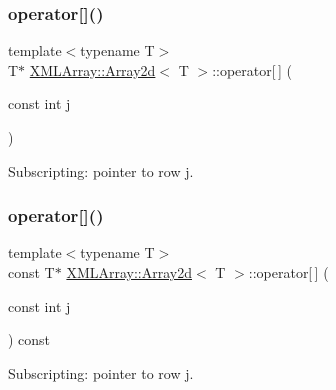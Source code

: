 \subsubsection{\texorpdfstring{operator[]()}{operator[]()}\hspace{0.1cm}{\footnotesize\ttfamily [3/6]}}
{\footnotesize\ttfamily template$<$typename T$>$ \\
T$\ast$ \mbox{\hyperlink{classXMLArray_1_1Array2d}{X\+M\+L\+Array\+::\+Array2d}}$<$ T $>$\+::operator\mbox{[}$\,$\mbox{]} (\begin{DoxyParamCaption}\item[{const int}]{j }\end{DoxyParamCaption})\hspace{0.3cm}{\ttfamily [inline]}}



Subscripting\+: pointer to row j. 

\mbox{\label{classXMLArray_1_1Array2d_a956a4739a0e6529302542b0fdf3c1da8}} 
\subsubsection{\texorpdfstring{operator[]()}{operator[]()}\hspace{0.1cm}{\footnotesize\ttfamily [4/6]}}
{\footnotesize\ttfamily template$<$typename T$>$ \\
const T$\ast$ \mbox{\hyperlink{classXMLArray_1_1Array2d}{X\+M\+L\+Array\+::\+Array2d}}$<$ T $>$\+::operator\mbox{[}$\,$\mbox{]} (\begin{DoxyParamCaption}\item[{const int}]{j }\end{DoxyParamCaption}) const\hspace{0.3cm}{\ttfamily [inline]}}



Subscripting\+: pointer to row j. 

\mbox{\label{classXMLArray_1_1Array2d_a956a4739a0e6529302542b0fdf3c1da8}} 
